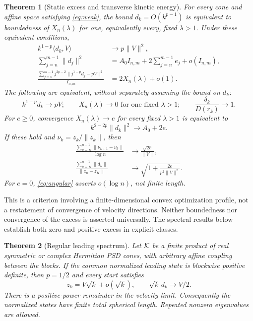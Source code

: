 \documentclass[11pt]{article}
\newtheorem{theorem}{Theorem}[section]
\theoremstyle{remark}\newtheorem{remark}[theorem]{Remark}
\newcommand{\ip}[2]{\langle #1,#2\rangle}\newcommand{\norm}[1]{\lVert #1\rVert}
\numberwithin{equation}{section}
\begin{document}
\begin{theorem}[Static excess and transverse kinetic energy]\label{thm:excess}
For every cone and affine space satisfying \eqref{eq:weak}, the bound $d_k=O(k^{p-1})$ is equivalent to boundedness of $X_n(\lambda)$ for one, equivalently every, fixed $\lambda>1$. Under these equivalent conditions,
\begin{align}
 k^{1-p}\ip{d_k}{V}&\longrightarrow p\norm V^2,\label{eq:radial}\\
 \sum_{j=n}^{m-1}\norm{d_j}^2
 &=A_0I_{n,m}+2\sum_{j=n}^{m-1}e_j+o(I_{n,m}),\label{eq:energy}\\
 \frac{\sum_{j=n}^{m-1}j^{2p-2}\norm{j^{1-p}d_j-pV}^2}{I_{n,m}}
 &=2X_n(\lambda)+o(1).\label{eq:transverse}
\end{align}
The following are equivalent, without separately assuming the bound on $d_k$:
\begin{equation}\label{eq:equiv}
 k^{1-p}d_k\to pV;\qquad
 X_n(\lambda)\to0\text{ for one fixed }\lambda>1;\qquad
 \frac{\delta_k}{D(r_k)}\to1.
\end{equation}
For $e\geq0$, convergence $X_n(\lambda)\to e$ for every fixed $\lambda>1$ is equivalent to
\begin{equation}\label{eq:normlimit}
 k^{2-2p}\norm{d_k}^2\longrightarrow A_0+2e.
\end{equation}
If these hold and $\nu_k=z_k/\norm{z_k}$, then
\begin{align}
 \frac{\sum_{k=K}^{n-1}\norm{\nu_{k+1}-\nu_k}}{\log n}
 &\longrightarrow\frac{\sqrt{2e}}{\norm V},\label{eq:angular}\\
 \frac{\sum_{k=K}^{n-1}\norm{d_k}}{\norm{z_n-z_K}}
 &\longrightarrow\sqrt{1+\frac{2e}{p^2\norm V^2}}.\label{eq:travel}
\end{align}
For $e=0$, \eqref{eq:angular} asserts $o(\log n)$, not finite length.
\end{theorem}

This is a criterion involving a finite-dimensional convex optimization profile, not a restatement of convergence of velocity directions. Neither boundedness nor convergence of the excess is asserted universally. The spectral results below establish both zero and positive excess in explicit classes.

\begin{theorem}[Regular leading spectrum]\label{thm:regular}
Let $\mathcal K$ be a finite product of real symmetric or complex Hermitian PSD cones, with arbitrary affine coupling between the blocks. If the common normalized leading state is blockwise positive definite, then $p=1/2$ and every start satisfies
\[
 z_k=V\sqrt{k}+o(\sqrt{k}),\qquad \sqrt{k}\,d_k\to V/2.
\]
There is a positive-power remainder in the velocity limit. Consequently the normalized states have finite total spherical length. Repeated nonzero eigenvalues are allowed.
\end{theorem}
\end{document}
